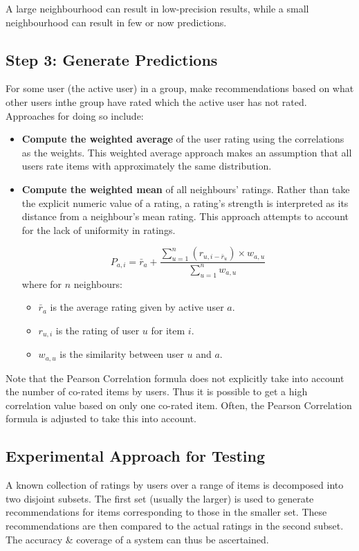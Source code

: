 \documentclass[a4paper,11pt]{article}
\begin{document}
A large neighbourhood can result in low-precision results, while a small neighbourhood can result in few or now predictions.

\subsection{Step 3: Generate Predictions}
For some user (the active user) in a group, make recommendations based on what other users inthe group have rated which the active user has not rated.
Approaches for doing so include:
\begin{itemize}
    \item   \textbf{Compute the weighted average} of the user rating using the correlations as the weights.
            This weighted average approach makes an assumption that all users rate items with approximately the same distribution.
    \item   \textbf{Compute the weighted mean} of all neighbours' ratings.
            Rather than take the explicit numeric value of a rating, a rating's strength is interpreted as its distance from a neighbour's mean rating.
            This approach attempts to account for the lack of uniformity in ratings.

            \[
                P_{a,i} = \bar{r}_a + \frac{\sum^n_{u=1} (r_{u,i - \bar{r}_u}) \times w_{a,u}}{\sum^n_{u=1} w_{a,u}}
            \]
            where for $n$ neighbours:
            \begin{itemize}
                \item   $\bar{r}_a$ is the average rating given by active user $a$.
                \item   $r_{u,i}$ is the rating of user $u$ for item $i$.
                \item   $w_{a,u}$ is the similarity between user $u$ and $a$.
            \end{itemize}
\end{itemize}

Note that the Pearson Correlation formula does not explicitly take into account the number of co-rated items by users.
Thus it is possible to get a high correlation value based on only one co-rated item.
Often, the Pearson Correlation formula is adjusted to take this into account.

\subsection{Experimental Approach for Testing}
A known collection of ratings by users over a range of items is decomposed into two disjoint subsets.
The first set (usually the larger) is used to generate recommendations for items corresponding to those in the smaller set.
These recommendations are then compared to the actual ratings in the second subset.
The accuracy \& coverage of a system can thus be ascertained.
\end{document}
